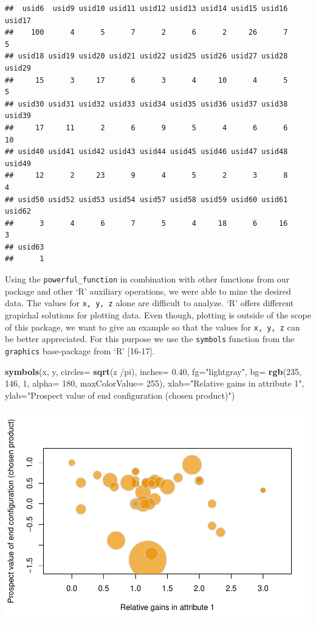 \documentclass[]{article}
\newenvironment{Shaded}{\begin{snugshade}}{\end{snugshade}}
\newcommand{\KeywordTok}[1]{\textcolor[rgb]{0.13,0.29,0.53}{\textbf{{#1}}}}
\newcommand{\DataTypeTok}[1]{\textcolor[rgb]{0.13,0.29,0.53}{{#1}}}
\newcommand{\DecValTok}[1]{\textcolor[rgb]{0.00,0.00,0.81}{{#1}}}
\newcommand{\FloatTok}[1]{\textcolor[rgb]{0.00,0.00,0.81}{{#1}}}
\newcommand{\StringTok}[1]{\textcolor[rgb]{0.31,0.60,0.02}{{#1}}}
\newcommand{\NormalTok}[1]{{#1}}
\begin{document}
\begin{verbatim}
##  usid6  usid9 usid10 usid11 usid12 usid13 usid14 usid15 usid16 usid17 
##    100      4      5      7      2      6      2     26      7      5 
## usid18 usid19 usid20 usid21 usid22 usid25 usid26 usid27 usid28 usid29 
##     15      3     17      6      3      4     10      4      5      5 
## usid30 usid31 usid32 usid33 usid34 usid35 usid36 usid37 usid38 usid39 
##     17     11      2      6      9      5      4      6      6     10 
## usid40 usid41 usid42 usid43 usid44 usid45 usid46 usid47 usid48 usid49 
##     12      2     23      9      4      5      2      3      8      4 
## usid50 usid52 usid53 usid54 usid57 usid58 usid59 usid60 usid61 usid62 
##      3      4      6      7      5      4     18      6     16      3 
## usid63 
##      1
\end{verbatim}

Using the \texttt{powerful\_function} in combination with other
functions from our package and other `R' auxiliary operations, we were
able to mine the desired data. The values for \texttt{x, y, z} alone are
difficult to analyze. `R' offers different grapichal solutions for
plotting data. Even though, plotting is outside of the scope of this
package, we want to give an example so that the values for
\texttt{x, y, z} can be better appreciated. For this purpose we use the
\texttt{symbols} function from the \texttt{graphics} base-package from
`R' {[}16-17{]}.

\begin{Shaded}
\begin{Highlighting}[]
\KeywordTok{symbols}\NormalTok{(x, y, }\DataTypeTok{circles=} \KeywordTok{sqrt}\NormalTok{(z /pi), }
        \DataTypeTok{inches=} \FloatTok{0.40}\NormalTok{, }\DataTypeTok{fg=}\StringTok{"lightgray"}\NormalTok{, }
        \DataTypeTok{bg=} \KeywordTok{rgb}\NormalTok{(}\DecValTok{235}\NormalTok{, }\DecValTok{146}\NormalTok{, }\DecValTok{1}\NormalTok{, }\DataTypeTok{alpha=} \DecValTok{180}\NormalTok{, }\DataTypeTok{maxColorValue=} \DecValTok{255}\NormalTok{),}
        \DataTypeTok{xlab=}\StringTok{"Relative gains in attribute 1"}\NormalTok{, }
        \DataTypeTok{ylab=}\StringTok{"Prospect value of end configuration (chosen product)"}\NormalTok{)}
\end{Highlighting}
\end{Shaded}

\includegraphics{Test3_files/figure-latex/unnamed-chunk-9-1.pdf}
\end{document}
